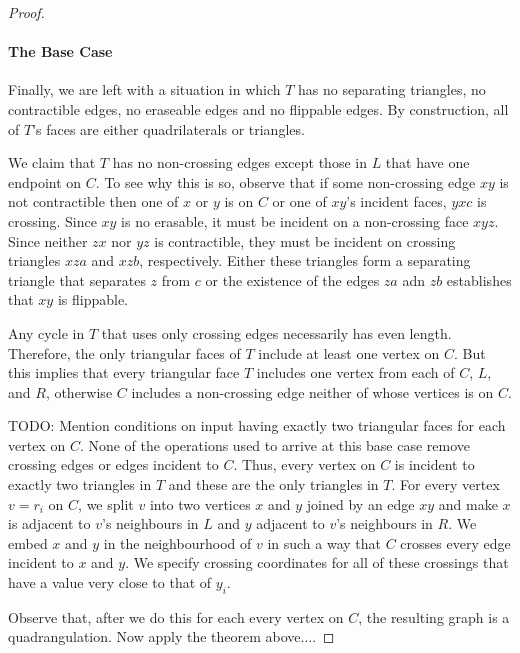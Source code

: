 \documentclass{patmorin}
\begin{document}
\begin{proof}
   \paragraph{The Base Case}

   Finally, we are left with a situation in which $T$ has no separating
   triangles, no contractible edges, no eraseable edges and no flippable
   edges.  By construction, all of $T$'s faces are either quadrilaterals
   or triangles.

   We claim that $T$ has no non-crossing edges except those in $L$
   that have one endpoint on $C$.  To see why this is so, observe that
   if some non-crossing edge $xy$ is not contractible then one of $x$
   or $y$ is on $C$ or one of $xy$'s incident faces, $yxc$ is crossing.
   Since $xy$ is no erasable, it must be incident on a non-crossing
   face $xyz$.  Since neither $zx$ nor $yz$ is contractible, they must
   be incident on crossing triangles $xza$ and $xzb$, respectively.
   Either these triangles form a separating triangle that separates $z$
   from $c$ or the existence of the edges $za$ adn $zb$ establishes that
   $xy$ is flippable.

   Any cycle in $T$ that uses only crossing edges necessarily has even
   length.  Therefore, the only triangular faces of $T$ include at least
   one vertex on $C$.  But this implies that every triangular face $T$
   includes one vertex from each of $C$, $L$, and $R$, otherwise $C$
   includes a non-crossing edge neither of whose vertices is on $C$.

   TODO: Mention conditions on input having exactly two triangular faces
   for each vertex on $C$.
   None of the operations used to arrive at this base case remove
   crossing edges or edges incident to $C$.  Thus, every vertex on $C$
   is incident to exactly two triangles in $T$ and these are the only
   triangles in $T$.  For every vertex $v=r_i$ on $C$, we split $v$
   into two vertices $x$ and $y$ joined by an edge $xy$ and make $x$
   is adjacent to $v$'s neighbours in $L$ and $y$ adjacent to $v$'s
   neighbours in $R$.  We embed $x$ and $y$ in the neighbourhood of $v$
   in such a way that $C$ crosses every edge incident to $x$ and $y$.
   We specify crossing coordinates for all of these crossings that have
   a value very close to that of $y_i$.

   Observe that, after we do this for each every vertex on $C$, the
   resulting graph is a quadrangulation.  Now apply the theorem above....


\end{proof}
\end{document}
